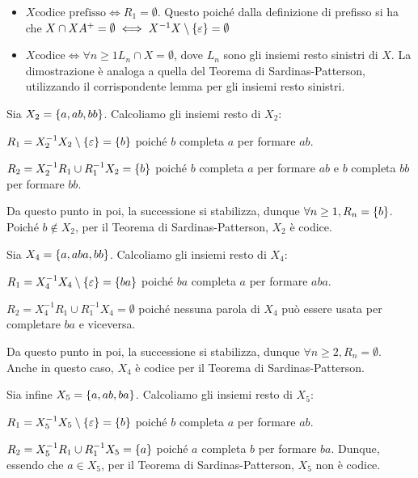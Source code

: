 \begin{note}[Osservazioni]
  \begin{itemize}
    \item \(X \text{codice prefisso} \iff R_1 = \emptyset\).
      Questo poiché dalla definizione di prefisso si ha che \(X \cap XA^+ = \emptyset \iff X^{-1}X \setminus \set{\varepsilon} = \emptyset\)
    \item \(X \text{codice} \iff \forall n \geq 1 L_n \cap X = \emptyset\),
      dove \(L_n\) sono gli insiemi resto sinistri di \(X\).
      La dimostrazione è analoga a quella del Teorema di Sardinas-Patterson, utilizzando il corrispondente lemma per gli insiemi resto sinistri.
  \end{itemize}
\end{note}

\begin{example}
  Sia \(X_2 = \set{a,ab,bb}\). Calcoliamo gli insiemi resto di \(X_2\):

  \(R_1 = X_2^{-1}X_2 \setminus \set{\varepsilon} = \set{b}\)
  poiché \(b\) completa \(a\) per formare \(ab\).

  \(R_2 = X_2^{-1}R_1 \cup R_1^{-1}X_2 = \set{b}\)
  poiché \(b\) completa \(a\) per formare \(ab\) e \(b\) completa \(bb\) per formare \(bb\).

  Da questo punto in poi, la successione si stabilizza, dunque \(\forall n \geq 1, R_n = \set{b}\).
  Poiché \(b \not\in X_2\), per il Teorema di Sardinas-Patterson, \(X_2\) è codice.

  Sia \(X_4 = \set{a,aba,bb}\). Calcoliamo gli insiemi resto di \(X_4\):
  
  \(R_1 = X_4^{-1}X_4 \setminus \set{\varepsilon} = \set{ba}\)
  poiché \(ba\) completa \(a\) per formare \(aba\).

  \(R_2 = X_4^{-1}R_1 \cup R_1^{-1}X_4 = \emptyset\)
  poiché nessuna parola di \(X_4\) può essere usata per completare \(ba\) e viceversa.
  
  Da questo punto in poi, la successione si stabilizza, dunque \(\forall n \geq 2, R_n = \emptyset\).
  Anche in questo caso, \(X_4\) è codice per il Teorema di Sardinas-Patterson.

  Sia infine \(X_5 = \set{a,ab,ba}\). Calcoliamo gli insiemi resto di \(X_5\):

  \(R_1 = X_5^{-1}X_5 \setminus \set{\varepsilon} = \set{b}\)
  poiché \(b\) completa \(a\) per formare \(ab\).
  
  \(R_2 = X_5^{-1}R_1 \cup R_1^{-1}X_5 = \set{a}\)
  poiché \(a\) completa \(b\) per formare \(ba\).
  Dunque, essendo che \(a \in X_5\), per il Teorema di Sardinas-Patterson, \(X_5\) non è codice.
\end{example}

